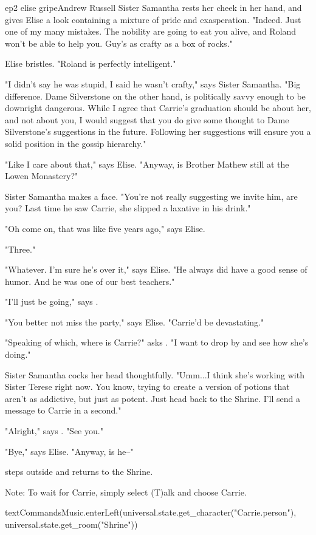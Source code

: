 \documentclass{book}
\begin{document}
\begin{childnode}{ep2 elise gripe}{Andrew Russell}
    Sister Samantha rests her cheek in her hand, and gives Elise a look containing a mixture of pride and exasperation. "Indeed. Just one of my many mistakes. The nobility are going to eat you alive, 
    and Roland won't be able to help you. Guy's as crafty as a box of rocks."

    Elise bristles. "Roland is perfectly intelligent."

    "I didn't say he was stupid, I said he wasn't crafty," says Sister Samantha. "Big difference. Dame Silverstone on the other hand, is politically savvy enough to be downright dangerous. While I agree that Carrie's graduation should be about her, and not about you, 
    I would suggest that you do give some thought to Dame Silverstone's suggestions in the future. Following her suggestions will ensure you a solid position in the gossip hierarchy."
    
    "Like I care about that," says Elise. "Anyway, is Brother Mathew still at the Lowen Monastery?"

    Sister Samantha makes a face. "You're not really suggesting we invite him, are you? Last time he saw Carrie, she slipped a laxative in his drink."

    "Oh come on, that was like five years ago," says Elise.

    "Three."

    "Whatever. I'm sure he's over it," says Elise. "He always did have a good sense of humor. And he was one of our best teachers."

    "I'll just be going," says \name{}.

    "You better not miss the party," says Elise. "Carrie'd be devastating."

    "Speaking of which, where is Carrie?" asks \name{}. "I want to drop by and see how she's doing."

    Sister Samantha cocks her head thoughtfully. "Umm...I think she's working with Sister Terese right now. You know, trying to create a version of potions that aren't as addictive, but just as potent. Just head back to the Shrine. I'll send a message to Carrie
    in a second."

    "Alright," says \name{}. "See you."

    "Bye," says Elise. "Anyway, is he--"

    \name{} steps outside and returns to the Shrine.

    Note: To wait for Carrie, simply select (T)alk and choose Carrie.

    \begin{code}

        textCommandsMusic.enterLeft(universal.state.get\_character("Carrie.person"), universal.state.get\_room("Shrine"))

    \end{code}

\end{childnode}
\end{document}
